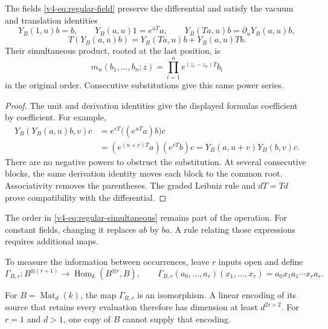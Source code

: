 \begin{proposition}\label{v4-prop:regular-field-identities}
The fields \eqref{v4-eq:regular-field} preserve the differential
and satisfy the vacuum and translation identities
\[
 Y_B(1,u)b=b,\qquad Y_B(a,u)1=e^{uT}a,
 \qquad Y_B(Ta,u)b=\partial_uY_B(a,u)b,
\]
\[
 T(Y_B(a,u)b)=Y_B(Ta,u)b+Y_B(a,u)Tb.
\]
Their simultaneous product, rooted at the last position, is
\begin{equation}\label{v4-eq:regular-simultaneous}
 m_n(b_1,\ldots,b_n;z)
       =\prod_{i=1}^n e^{(z_i-z_n)T}b_i
\end{equation}
in the original order. Consecutive substitutions give this
same power series.
\end{proposition}

\begin{proof}
The unit and derivation identities give the displayed formulas
coefficient by coefficient. For example,
\[
 \begin{split}
 Y_B(Y_B(a,u)b,v)c
   &=e^{vT}\bigl((e^{uT}a)b\bigr)c\\
   &=(e^{(u+v)T}a)(e^{vT}b)c
     =Y_B(a,u+v)Y_B(b,v)c.
 \end{split}
\]
There are no negative powers to obstruct the substitution.
At several consecutive blocks, the same derivation identity
moves each block to the common root. Associativity removes
the parentheses. The graded Leibniz rule and \(dT=Td\)
prove compatibility with the differential.
\end{proof}

The order in \eqref{v4-eq:regular-simultaneous} remains part
of the operation. For constant fields, changing it replaces
\(ab\) by \(ba\). A rule relating those expressions requires
additional maps.

To measure the information between occurrences, leave \(r\)
inputs open and define
\begin{equation}\label{v4-eq:regular-open-slots}
 \Gamma_{B,r}:B^{\otimes(r+1)}
       \longrightarrow\operatorname{Hom}_k(B^{\otimes r},B),
 \qquad
 \Gamma_{B,r}(a_0,\ldots,a_r)(x_1,\ldots,x_r)
       =a_0x_1a_1\cdots x_ra_r .
\end{equation}

\begin{proposition}
\label{v4-prop:regular-matrix-context}
For \(B=\operatorname{Mat}_d(k)\), the map
\(\Gamma_{B,r}\) is an isomorphism. A linear encoding of its
source that retains every evaluation therefore has dimension
at least \(d^{2r+2}\). For \(r=1\) and \(d>1\), one copy of
\(B\) cannot supply that encoding.
\end{proposition}

